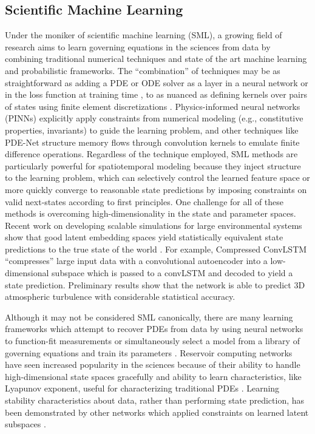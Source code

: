 \subsection{Scientific Machine Learning}
Under the moniker of scientific machine learning (SML), a growing field of research aims to learn governing equations in the sciences from data by combining traditional numerical techniques and state of the art machine learning and probabilistic frameworks. The ``combination'' of techniques may be as straightforward as adding a PDE or ODE solver as a layer in a neural network \autocite{pakravan2021solving} or in the loss function at training time \autocite{raissi2019physics}, to as nuanced as defining kernels over pairs of states using finite element discretizations \autocite{raissi2018numerical}. Physics-informed neural networks (PINNs) \autocite{raissi2019physics,tartakovsky2018learning} explicitly apply constraints from numerical modeling (e.g., constitutive properties, invariants) to guide the learning problem, and other techniques like PDE-Net \autocite{long2017pde} structure memory flows through convolution kernels to emulate finite difference operations. Regardless of the technique employed, SML methods are particularly powerful for spatiotemporal modeling because they inject structure to the learning problem, which can selectively control the learned feature space or more quickly converge to reasonable state predictions by imposing constraints on valid next-states according to first principles. One challenge for all of these methods is overcoming high-dimensionality in the state and parameter spaces.
Recent work on developing scalable simulations for large environmental systems show that good latent embedding spaces yield statistically equivalent state predictions to the true state of the world \autocite{qian2020lift,mardt2020deep,baddoo2022kernel,baddoo2021physics}. For example, Compressed ConvLSTM \autocite{mohan2019compressed} ``compresses'' large input data with a convolutional autoencoder into a low-dimensional subspace which is passed to a convLSTM and decoded to yield a state prediction. Preliminary results show that the network is able to predict 3D atmospheric turbulence with considerable statistical accuracy. 

Although it may not be considered SML canonically, there are many learning frameworks which attempt to recover PDEs from data by using neural networks to function-fit measurements \autocite{berg2019data,kaiser2018sparse} or simultaneously select a model from a library of governing equations and train its parameters \autocite{rudy2017data,sun2020neupde}. Reservoir computing networks have seen increased popularity in the sciences because of their ability to handle high-dimensional state spaces gracefully and ability to learn characteristics, like Lyapunov exponent, useful for characterizing traditional PDEs \autocite{pathak2017using}. Learning stability characteristics about data, rather than performing state prediction, has been demonstrated by other networks which applied constraints on learned latent subspaces \autocite{blanchard2019learning}.

